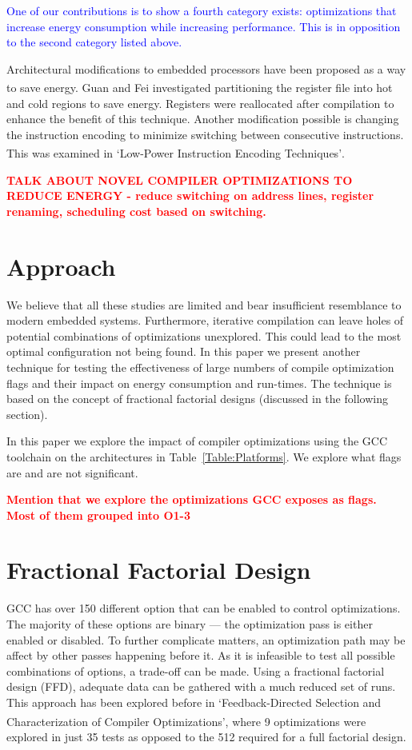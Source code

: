 \documentclass[twocolumn]{article}
\newcommand{\todo}[1]{\textbf{\textcolor{red}{#1}}}
\let\oldcite\cite
\renewcommand{\cite}[1]{\textsuperscript{\oldcite{#1}}}
\begin{document}
\textcolor{blue}{One of our contributions is to show a fourth category exists: optimizations that increase energy consumption while increasing performance. This is in opposition to the second category listed above.}

Architectural modifications to embedded processors have been proposed as a way to save energy. Guan and Fei investigated partitioning the register file\cite{RegisterFilePartitioning} into hot and cold regions to save energy. Registers were reallocated after compilation to enhance the benefit of this technique. Another modification possible is changing the instruction encoding to minimize switching between consecutive instructions. This was examined in `Low-Power Instruction Encoding Techniques'\cite{LowPowerInstructionEncodings}.

\todo{TALK ABOUT NOVEL COMPILER OPTIMIZATIONS TO REDUCE ENERGY - reduce switching on address lines, register renaming, scheduling cost based on switching.}


\section*{Approach}

We believe that all these studies are limited and bear insufficient resemblance to modern embedded systems. Furthermore, iterative compilation can leave holes of potential combinations of optimizations unexplored. This could lead to the most optimal configuration not being found. In this paper we present another technique for testing the effectiveness of large numbers of compile optimization flags and their impact on energy consumption and run-times. The technique is based on the concept of fractional factorial designs (discussed in the following section).

In this paper we explore the impact of compiler optimizations using the GCC toolchain on the architectures in Table~\ref{Table:Platforms}. We explore what flags are and are not significant.

\todo{Mention that we explore the optimizations GCC exposes as flags. Most of them grouped into O1-3}


\section*{Fractional Factorial Design}

GCC has over 150 different option that can be enabled to control optimizations. The majority of these options are binary --- the optimization pass is either enabled or disabled. To further complicate matters, an optimization path may be affect by other passes happening before it. As it is infeasible to test all possible combinations of options, a trade-off can be made. Using a fractional factorial design (FFD), adequate data can be gathered with a much reduced set of runs. This approach has been explored before in `Feedback-Directed Selection and Characterization of Compiler Optimizations'\cite{IntelPaper}, where 9 optimizations were explored in just 35 tests as opposed to the 512 required for a full factorial design.
\end{document}
